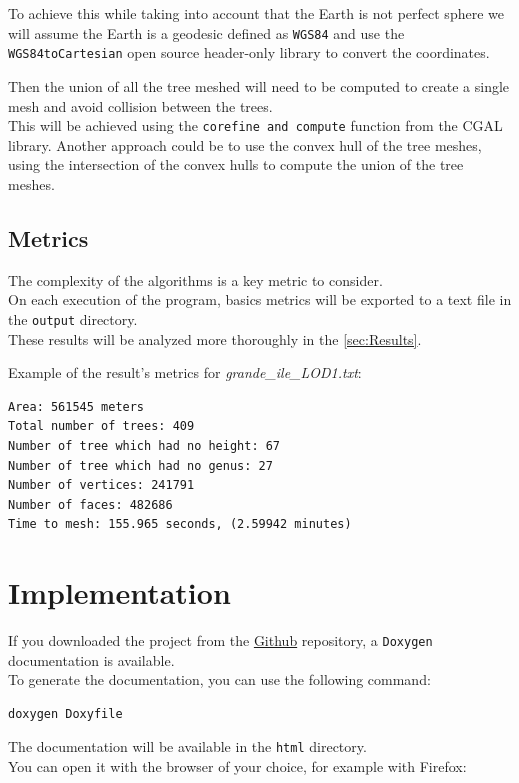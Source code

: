 \documentclass[12pt]{article}
\begin{document}
To achieve this while taking into account that the Earth is not perfect sphere
we will assume the Earth is a geodesic defined as \texttt{WGS84}\cite{wgs84} and use 
the \texttt{WGS84toCartesian}\cite{wgs84_to_cartesian} open source header-only
library to convert the coordinates.

Then the union of all the tree meshed will need to be computed to create a single mesh
and avoid collision between the trees. \\
This will be achieved using the \texttt{corefine and compute}\cite{corefine-compute}
function from the CGAL library.
Another approach could be to use the convex hull of the tree meshes, using the
intersection of the convex hulls to compute the union of the tree meshes.

\subsection{Metrics}
The complexity of the algorithms is a key metric to consider. \\
On each execution of the program, basics metrics will be exported to a text file in
the \texttt{output} directory. \\
These results will be analyzed more thoroughly in the \autoref{sec:Results}.

Example of the result's metrics for \textit{grande\_ile\_LOD1.txt}:

\begin{lstlisting}
Area: 561545 meters
Total number of trees: 409
Number of tree which had no height: 67
Number of tree which had no genus: 27
Number of vertices: 241791
Number of faces: 482686
Time to mesh: 155.965 seconds, (2.59942 minutes)
\end{lstlisting}

\section{Implementation}
If you downloaded the project from the \href{https://github.com/master-csmi/2024-m1-vegetation}{Github}
repository, a \texttt{Doxygen} documentation is available. \\
To generate the documentation, you can use the following command:

\begin{lstlisting}[language=bash]
doxygen Doxyfile
\end{lstlisting}

The documentation will be available in the \texttt{html} directory.\\
You can open it with the browser of your choice, for example with Firefox:
\end{document}
